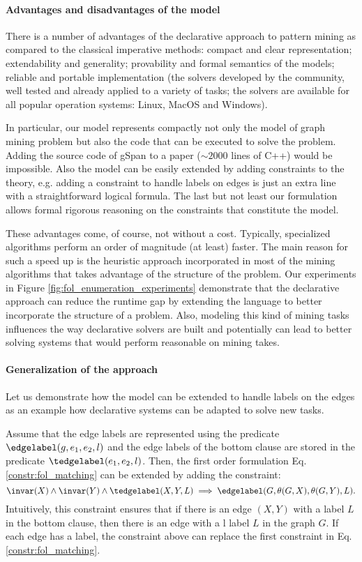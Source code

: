 \paragraph{Advantages and disadvantages of the model}
There is a number of advantages of the declarative approach to pattern mining as compared to the classical imperative methods: compact and clear representation; extendability and generality; provability and formal semantics of the models; reliable and portable implementation (the solvers developed by the community, well tested and already applied to a variety of tasks; the solvers are available for all popular operation systems: Linux, MacOS and Windows).

In particular, our model represents compactly not only the model of graph mining problem but also the code that can be executed to solve the problem. Adding the source code of gSpan \parencite{gspan} to a paper ($\sim2000$ lines of C++) would be impossible. Also the model can be easily extended by adding constraints to the theory, e.g. adding a constraint to handle labels on edges is just an extra line with a straightforward logical formula. The last but not least our formulation allows formal rigorous reasoning on the constraints that constitute the model.

These advantages come, of course, not without a cost. Typically, specialized algorithms perform an order of magnitude (at least) faster. The main reason for such a speed up is the heuristic approach incorporated in most of the mining algorithms that takes advantage of the structure of the problem. Our experiments in Figure \ref{fig:fol_enumeration_experiments} demonstrate that the declarative approach can reduce the runtime gap by extending the language to better incorporate the structure of a problem. Also, modeling this kind of mining tasks influences the way declarative solvers are built and potentially can lead to better solving systems that would perform reasonable on mining takes.
\paragraph{Generalization of the approach}
Let us demonstrate how the model can be extended to handle labels on the edges as an example how declarative systems can be adapted to solve new tasks.

Assume that the edge labels are represented using the predicate $\edgelabel(g,e_1,e_2,l)$ and the edge labels of the bottom clause are stored in the predicate  $\tedgelabel(e_1,e_2,l)$. Then, the first order formulation Eq. \ref{constr:fol_matching} can be extended by adding the constraint:
\begin{equation*}
\invar(X) \wedge \invar(Y) \wedge \tedgelabel(X,Y,L) \implies \edgelabel(G,\theta(G,X), \theta(G,Y), L).
\end{equation*}
Intuitively, this constraint ensures that if there is an edge $(X,Y)$ with a label $L$ in the bottom clause, then there is an edge with a l label $L$ in the graph $G$. If each edge has a label, the constraint above can replace the first constraint in Eq. \ref{constr:fol_matching}.

